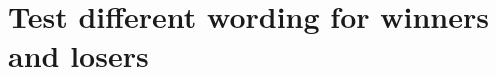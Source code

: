 \documentclass[11pt]{article}
\begin{document}











\section{Test different wording for winners and losers}
\end{document}
